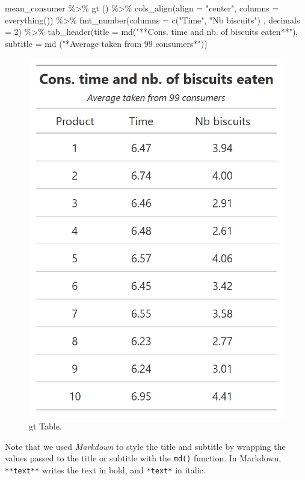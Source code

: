 \documentclass[
]{krantz}
\makeatletter
\newenvironment{Shaded}{\begin{snugshade}}{\end{snugshade}}
\newcommand{\AttributeTok}[1]{\textcolor[rgb]{0.61,0.61,0.61}{#1}}
\newcommand{\DecValTok}[1]{\textcolor[rgb]{0.06,0.06,0.06}{#1}}
\newcommand{\FunctionTok}[1]{\textcolor[rgb]{0,0,0}{#1}}
\newcommand{\NormalTok}[1]{#1}
\newcommand{\SpecialCharTok}[1]{\textcolor[rgb]{0,0,0}{#1}}
\newcommand{\StringTok}[1]{\textcolor[rgb]{0.5,0.5,0.5}{#1}}
\newenvironment{kframe}{%
\medskip{}
\setlength{\fboxsep}{.8em}
 \def\at@end@of@kframe{}%
 \ifinner\ifhmode%
  \def\at@end@of@kframe{\end{minipage}}%
  \begin{minipage}{\columnwidth}%
 \fi\fi%
 \def\FrameCommand##1{\hskip\@totalleftmargin \hskip-\fboxsep
 \colorbox{shadecolor}{##1}\hskip-\fboxsep
     \hskip-\linewidth \hskip-\@totalleftmargin \hskip\columnwidth}%
 \MakeFramed {\advance\hsize-\width
   \@totalleftmargin\z@ \linewidth\hsize
   \@setminipage}}%
 {\par\unskip\endMakeFramed%
 \at@end@of@kframe}
\renewenvironment{Shaded}{\begin{kframe}}{\end{kframe}}
\makeatother
\begin{document}
\begin{Shaded}
\begin{Highlighting}[]
\NormalTok{mean\_consumer }\SpecialCharTok{\%\textgreater{}\%}
  \FunctionTok{gt}\NormalTok{ () }\SpecialCharTok{\%\textgreater{}\%}
  \FunctionTok{cols\_align}\NormalTok{(}\AttributeTok{align =} \StringTok{"center"}\NormalTok{, }\AttributeTok{columns =} \FunctionTok{everything}\NormalTok{()) }\SpecialCharTok{\%\textgreater{}\%}
  \FunctionTok{fmt\_number}\NormalTok{(}\AttributeTok{columns =} \FunctionTok{c}\NormalTok{(}\StringTok{"Time"}\NormalTok{, }\StringTok{"Nb biscuits"}\NormalTok{) , }\AttributeTok{decimals =} \DecValTok{2}\NormalTok{) }\SpecialCharTok{\%\textgreater{}\%}
  \FunctionTok{tab\_header}\NormalTok{(}\AttributeTok{title =} \FunctionTok{md}\NormalTok{(}\StringTok{"**Cons. time and nb. of biscuits eaten**"}\NormalTok{), }
             \AttributeTok{subtitle =} \FunctionTok{md}\NormalTok{ (}\StringTok{"*Average taken from 99 consumers*"}\NormalTok{))}
\end{Highlighting}
\end{Shaded}

\begin{figure}

{\centering \includegraphics[width=0.5\linewidth]{images/gt_table} 

}

\caption{gt Table.}\label{fig:gttable}
\end{figure}

Note that we used \emph{Markdown} to style the title and subtitle by wrapping the values passed to the title or subtitle with the \texttt{md()} function. In Markdown, \texttt{**text**} writes the text in bold, and \texttt{*text*} in italic.
\end{document}
